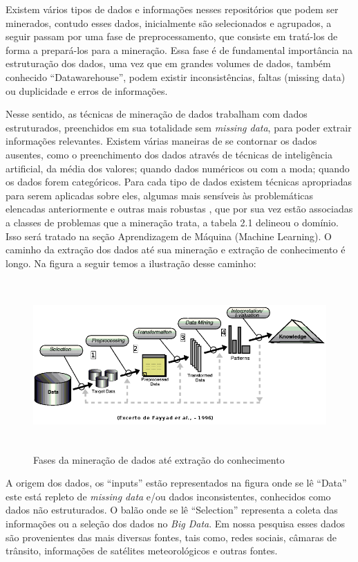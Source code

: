 Existem vários tipos de dados e informações nesses repositórios que podem ser minerados, contudo esses dados, inicialmente são selecionados e agrupados, a seguir passam por 
uma fase de preprocessamento, que consiste em tratá-los de forma a prepará-los para a mineração. Essa fase é de 
fundamental importância na estruturação dos dados, uma vez que em grandes volumes de dados, também conhecido ``Datawarehouse'', podem existir inconsistências, faltas (missing data) ou 
duplicidade e erros de informações.

Nesse sentido, as técnicas de mineração de dados trabalham com dados estruturados, preenchidos em sua totalidade sem \textit{missing data}, para poder extrair informações relevantes.
Existem várias maneiras de se contornar os dados ausentes, como o preenchimento dos dados através de técnicas de inteligência artificial, da média dos valores; quando dados numéricos 
ou com a moda; quando os dados forem categóricos. Para cada tipo de dados existem técnicas apropriadas para serem aplicadas sobre eles, algumas mais sensíveis às problemáticas elencadas anteriormente
e outras mais robustas \cite{DataMining2}, que por sua vez estão associadas a classes de problemas que a mineração trata, a tabela 2.1 delineou o domínio.
Isso será tratado na seção Aprendizagem de Máquina (Machine Learning).
O caminho da extração dos dados até sua mineração e extração de conhecimento é longo.
Na figura a seguir temos a ilustração desse caminho:

\begin{figure}[!ht]
\centering
\caption{Fases da mineração de dados até extração do conhecimento}
\includegraphics[width=135mm, height=65mm]{Figuras/BigData/FayyadSemFundo.png}
\end{figure}



A origem dos dados, os ``inputs'' estão representados na figura onde se lê ``Data'' este está repleto de \textit{missing data} e/ou dados inconsistentes, conhecidos como dados não estruturados. 
O balão onde se lê ``Selection'' representa a coleta das informações ou a seleção dos dados no \textit{Big Data}.
Em nossa pesquisa esses dados são provenientes das mais diversas fontes, tais como, redes sociais, câmaras de trânsito, informações de satélites meteorológicos e outras fontes.

